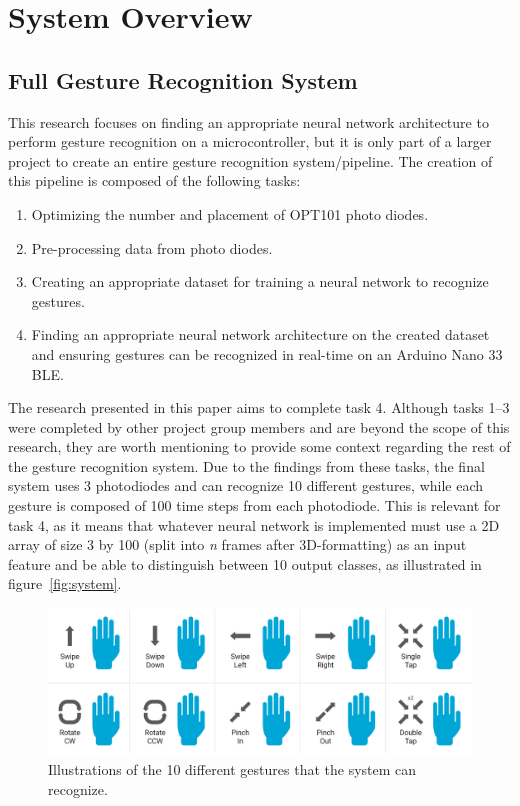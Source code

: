 \section{System Overview}\label{sec:system-overview}
\subsection{Full Gesture Recognition System}\label{subsec:full-gesture-recognition-pipeline}
This research focuses on finding an appropriate neural network architecture to perform gesture recognition on a microcontroller, but it is only part of a larger project to create an entire gesture recognition system/pipeline.
The creation of this pipeline is composed of the following tasks:
\begin{enumerate}
    \item Optimizing the number and placement of OPT101 photo diodes.
    \item Pre-processing data from photo diodes.
    \item Creating an appropriate dataset for training a neural network to recognize gestures.
    \item Finding an appropriate neural network architecture on the created dataset and ensuring gestures can be recognized in real-time on an Arduino Nano 33 BLE\@.
\end{enumerate}

The research presented in this paper aims to complete task 4.
Although tasks 1--3 were completed by other project group members and are beyond the scope of this research, they are worth mentioning to provide some context regarding the rest of the gesture recognition system.
Due to the findings from these tasks, the final system uses 3 photodiodes and can recognize 10 different gestures, while each gesture is composed of 100 time steps from each photodiode.
This is relevant for task 4, as it means that whatever neural network is implemented must use a 2D array of size 3 by 100 (split into \textit{n} frames after 3D-formatting) as an input feature and be able to distinguish between 10 output classes, as illustrated in figure~\ref{fig:system}.

\begin{figure}[h]
    \centering
    \captionsetup{justification=centering}
    \includegraphics[width=\linewidth]{figures/gestures}
    \caption{Illustrations of the 10 different gestures that the system can recognize.}
    \label{fig:gestures}
\end{figure}

